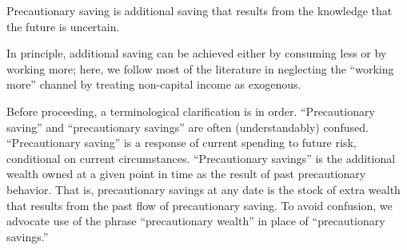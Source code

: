 
Precautionary saving is additional saving that results from the
knowledge that 
the future is uncertain.  

In principle, additional saving can be achieved either by consuming
less or by working more; here, we follow most of the literature in
neglecting the ``working more'' channel by treating non-capital income as
exogenous.

Before proceeding, a terminological clarification is in order.
``Precautionary saving'' and ``precautionary savings'' are often
(understandably) confused.  ``Precautionary saving'' is a response of
current spending to future risk, conditional on current circumstances.
``Precautionary savings'' is the additional wealth owned at a given point in
time as the result of past precautionary behavior.  That is,
precautionary savings at any date is the stock of extra wealth that
results from the past flow of precautionary saving.  To avoid
confusion, we advocate use of the phrase ``precautionary wealth'' in
place of ``precautionary savings.''

